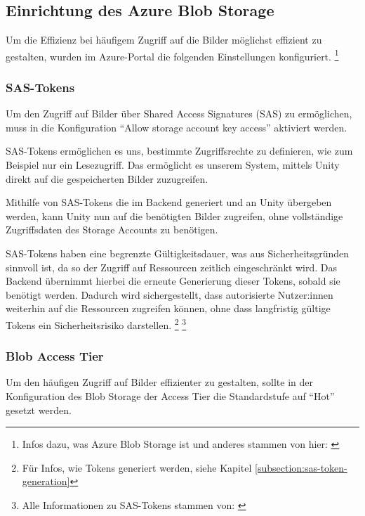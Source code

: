 \subsection{Einrichtung des Azure Blob Storage}
\label{subsection:azure-blob-storage-getting-started}

Um die Effizienz bei häufigem Zugriff auf die Bilder möglichst effizient zu gestalten, 
wurden im Azure-Portal die folgenden Einstellungen konfiguriert.
\footnote{Infos dazu, was Azure Blob Storage ist und anderes stammen von hier: \cite{MicrosoftCorporationd}}

\subsubsection{SAS-Tokens}

Um den Zugriff auf Bilder über Shared Access Signatures (SAS) zu ermöglichen, muss in 
die Konfiguration ``Allow storage account key access'' aktiviert werden.

SAS-Tokens ermöglichen es uns, bestimmte Zugriffsrechte zu definieren, wie zum Beispiel
nur ein Lesezugriff. Das ermöglicht es unserem System, mittels Unity direkt auf die
gespeicherten Bilder zuzugreifen.

Mithilfe von SAS-Tokens die im Backend generiert und an Unity übergeben werden, 
kann Unity nun auf die benötigten Bilder zugreifen, ohne vollständige Zugriffsdaten 
des Storage Accounts zu benötigen. 

SAS-Tokens haben eine begrenzte Gültigkeitsdauer, was aus Sicherheitsgründen sinnvoll ist, 
da so der Zugriff auf Ressourcen zeitlich eingeschränkt wird. Das Backend übernimmt hierbei
die erneute Generierung dieser Tokens, sobald sie benötigt werden. Dadurch wird sichergestellt, 
dass autorisierte Nutzer:innen weiterhin auf die Ressourcen zugreifen können, ohne dass 
langfristig gültige Tokens ein Sicherheitsrisiko darstellen.
\footnote{Für Infos, wie Tokens generiert werden, siehe Kapitel \ref{subsection:sas-token-generation}}
\footnote{Alle Informationen zu SAS-Tokens stammen von: \cite{MicrosoftCorporationa}}


\subsubsection{Blob Access Tier}

Um den häufigen Zugriff auf Bilder effizienter zu gestalten, sollte in der Konfiguration 
des Blob Storage der Access Tier die Standardstufe auf ``Hot'' gesetzt werden.

